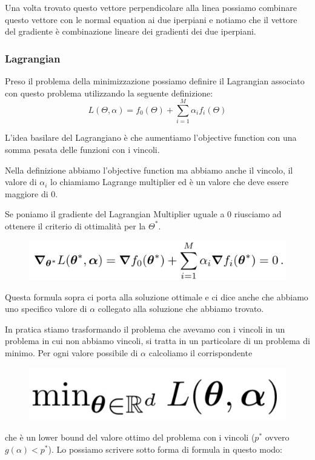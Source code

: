 \documentclass[14pt]{extreport}
\begin{document}
Una volta trovato questo vettore perpendicolare alla linea possiamo combinare questo vettore con le normal equation ai due iperpiani e notiamo che il
vettore del gradiente è combinazione lineare dei gradienti dei due iperpiani.

\subsubsection{Lagrangian}

Preso il problema della minimizzazione possiamo definire il Lagrangian associato con questo problema utilizzando la seguente definizione: $$L(\Theta,
\alpha) = f_0(\Theta) + \sum_{i=1}^M \alpha_i f_i(\Theta)$$

L'idea basilare del Lagrangiano è che aumentiamo l'objective function con una somma pesata delle funzioni con i vincoli.


Nella definizione abbiamo l'objective function ma abbiamo anche il vincolo, il valore di $\alpha_i$ lo chiamiamo Lagrange multiplier ed è un valore
che deve essere maggiore di 0.

Se poniamo il gradiente del Lagrangian Multiplier uguale a 0 riusciamo ad ottenere il criterio di ottimalità per la $\Theta^*$.

\begin{figure}[H]
\centering
\includegraphics[width=0.7\linewidth]{299.jpeg}
\end{figure}

Questa formula sopra ci porta alla soluzione ottimale e ci dice anche che abbiamo uno specifico valore di $\alpha$ collegato alla soluzione che
abbiamo trovato.
 

In pratica stiamo trasformando il problema che avevamo con i vincoli in un problema in cui non abbiamo vincoli, si tratta in un particolare di un
problema di minimo. Per ogni valore possibile di $\alpha$ calcoliamo il corrispondente \begin{figure}[H]
\centering
\includegraphics[width=0.3\linewidth]{300.jpeg}
\end{figure}

che è un lower bound del valore ottimo del problema con i vincoli ($p^*$ ovvero $g(\alpha) < p^*$). Lo possiamo scrivere sotto forma di formula in
questo modo:
\end{document}

